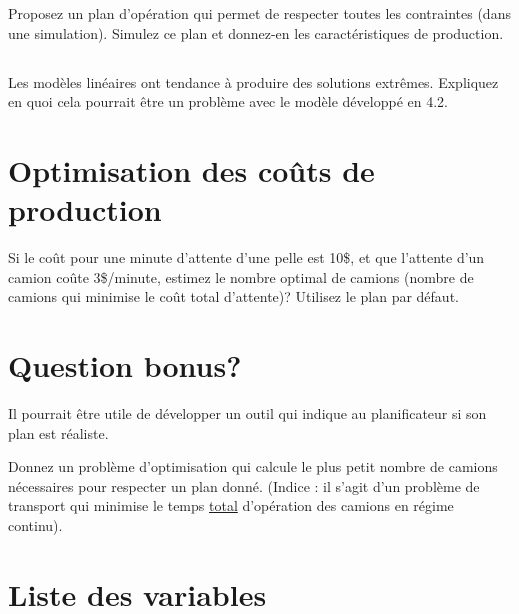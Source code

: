\documentclass[letterpaper,12pt]{article}
\begin{document}
	Proposez un plan d'opération qui permet de respecter toutes les contraintes (dans une simulation). Simulez ce plan et donnez-en les caractéristiques de production.
	
	\subsection{}
	Les modèles linéaires ont tendance à produire des solutions extrêmes. Expliquez en quoi cela pourrait être un problème avec le modèle développé en 4.2.
	
	
	
	
	
	
	\section{Optimisation des coûts de production}
	
	Si le coût pour une minute d’attente d’une pelle est 10\$, et que l’attente d’un camion coûte 3\$/minute, estimez le nombre optimal de camions (nombre de camions qui minimise le coût total d'attente)? Utilisez le plan par défaut.
	
	
	\section*{Question bonus?}
	Il pourrait être utile de développer un outil qui indique au planificateur si son plan est réaliste.
	
	Donnez un problème d'optimisation qui calcule le plus petit nombre de camions nécessaires pour respecter un plan donné. (Indice : il s'agit d'un problème de transport qui minimise le temps \underline{total} d'opération des camions en régime continu).
	
	
	\section{Liste des variables}
	\label{sec:vars}
	
\end{document}
